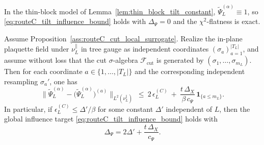 \begin{remark}\label{rem:routeC_tilt_influence_thin_block}
In the thin-block model of Lemma~\ref{lem:thin_block_tilt_constant}, $\widetilde{\Psi}_L^{(\alpha)}\equiv 1$,
so \eqref{eq:routeC_tilt_influence_bound} holds with $\Delta_{\Psi}=0$ and the $\chi^2$-flatness is exact.
\end{remark}

\begin{lemma}\label{lem:routeC_tilt_influence_from_surrogate}
Assume Proposition~\ref{ass:routeC_cut_local_surrogate}.
Realize the in-plane plaquette field under $\nu_L^{\parallel}$ in tree gauge as independent coordinates
$(\sigma_a)_{a=1}^{|T_L|}$, and assume without loss that the cut $\sigma$-algebra
$\mathscr F_{\mathrm{cut}}$ is generated by $(\sigma_1,\dots,\sigma_{m_L})$.
Then for each coordinate $a\in\{1,\dots,|T_L|\}$ and the corresponding independent resampling $\sigma_a'$, one has
\begin{equation}\label{eq:routeC_tilt_influence_from_surrogate}
\big\|\widetilde{\Psi}_L^{(\alpha)}-\big(\widetilde{\Psi}_L^{(\alpha)}\big)^{(a)}\big\|_{L^2(\nu_L^{\parallel})}
\ \le\
2\,\epsilon_L^{(C)}\ +\ \frac{t\,\Delta_X}{\beta\,c_{\Psi}}\,\mathbf 1_{\{a\le m_L\}}.
\end{equation}
In particular, if $\epsilon_L^{(C)}\le \Delta'/\beta$ for some constant $\Delta'$ independent of $L$, then the global influence target
\eqref{eq:routeC_tilt_influence_bound} holds with
\begin{equation}\label{eq:routeC_tilt_influence_constant_from_surrogate}
\Delta_{\Psi}=2\Delta'+\frac{t\,\Delta_X}{c_{\Psi}}.
\end{equation}
\end{lemma}

